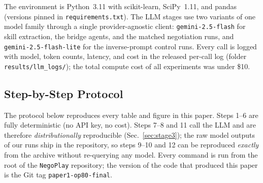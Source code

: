 \documentclass[11pt,a4paper]{article}
\begin{document}
The environment is Python~3.11 with scikit-learn, SciPy~1.11, and
pandas (versions pinned in \texttt{requirements.txt}). The LLM stages
use two variants of one model family through a single
provider-agnostic client: \texttt{gemini-2.5-flash} for skill
extraction, the bridge agents, and the matched negotiation runs, and
\texttt{gemini-2.5-flash-lite} for the inverse-prompt control runs.
Every call is logged with model, token counts, latency, and cost in
the released per-call log (folder \texttt{results/llm\_logs/}); the
total compute cost of all experiments was under \$10.

\subsection{Step-by-Step Protocol}\label{app:steps}

The protocol below reproduces every table and figure in this paper.
Steps 1--6 are fully deterministic (no API key, no cost). Steps 7--8
and 11 call the LLM and are therefore \emph{distributionally}
reproducible (Sec.~\ref{sec:stage3}); the raw model outputs of our runs
ship in the repository, so steps 9--10 and 12 can be reproduced
\emph{exactly} from the archive without re-querying any model. Every
command is run from the root of the \texttt{NegoPlay} repository; the
version of the code that produced this paper is the Git tag
\texttt{paper1-op80-final}.
\end{document}
